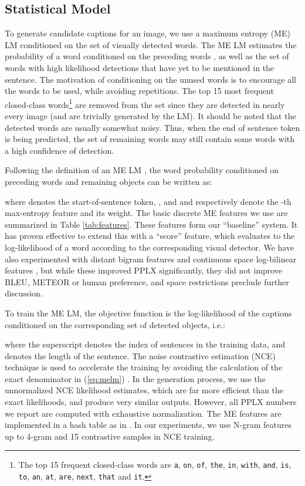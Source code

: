 \documentclass[10pt,twocolumn,letterpaper]{article}
\begin{document}
\subsection{Statistical Model}\label{ssec:lm}

To generate candidate captions for an image, we use a maximum entropy (ME) LM conditioned on the set of visually detected words. The ME LM estimates the probability of a word  conditioned on the preceding words , as well as the set of words with high likelihood detections  that have yet to be mentioned in the sentence. The motivation of conditioning on the unused words is to encourage all the words to be used, while avoiding repetitions. The top 15 most frequent closed-class words\footnote{The top 15 frequent closed-class words are \texttt{a}, \texttt{on}, \texttt{of}, \texttt{the}, \texttt{in}, \texttt{with}, \texttt{and}, \texttt{is}, \texttt{to}, \texttt{an}, \texttt{at}, \texttt{are}, \texttt{next}, \texttt{that} and \texttt{it}.} are removed from the set  since they are detected in nearly every image (and are trivially generated by the LM). It should be noted that the detected words are usually somewhat noisy. Thus, when the end of sentence token is being predicted, the set of remaining words may still contain some words with a high confidence of detection.

Following the definition of an ME LM \cite{Berger1996}, the word probability conditioned on preceding words and remaining objects can be written as:\vspace{-.5em}

{\scriptsize
}where  denotes the start-of-sentence token, , and  and  respectively denote the -th max-entropy feature and its weight. The basic discrete ME features we use are summarized in Table \ref{tab:features}. These features form our ``baseline'' system. It has proven effective to extend this with a ``score'' feature, which evaluates to the log-likelihood of a word according to the corresponding visual detector. We have also experimented with distant bigram features \cite{lau1993trigger} and continuous space log-bilinear features \cite{Mnih2007,Mnih2012}, but while these improved PPLX significantly, they did not improve BLEU, METEOR or human preference, and space restrictions preclude further discussion.

To train the ME LM, the objective function is the log-likelihood of the captions conditioned on the corresponding set of detected objects, i.e.:

\vspace{-2mm}{\small
}where the superscript  denotes the index of sentences in the training data, and  denotes the length of the sentence. The noise contrastive estimation (NCE) technique is used to accelerate the training by avoiding the calculation of the exact denominator in (\ref{eq:melm}) \cite{Mnih2012}. In the generation process, we use the unnormalized NCE likelihood estimates, which are far more efficient than the exact likelihoods, and produce very similar outputs. However, all PPLX numbers we report are computed with exhaustive normalization. The ME features are implemented in a hash table as in \cite{mikolov2011strategies}. In our experiments, we use N-gram features up to 4-gram and 15 contrastive samples in NCE training.
\end{document}
